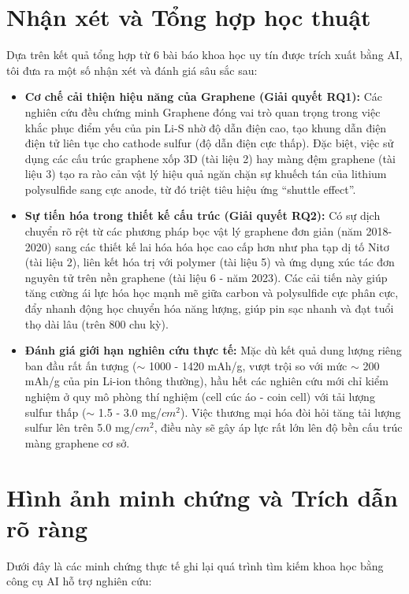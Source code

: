 \documentclass[12pt,a4paper]{article}
\begin{document}
\newpage
\section{Nhận xét và Tổng hợp học thuật}

Dựa trên kết quả tổng hợp từ 6 bài báo khoa học uy tín được trích xuất bằng AI, tôi đưa ra một số nhận xét và đánh giá sâu sắc sau:

\begin{itemize}
    \item \textbf{Cơ chế cải thiện hiệu năng của Graphene (Giải quyết RQ1):} Các nghiên cứu đều chứng minh Graphene đóng vai trò quan trọng trong việc khắc phục điểm yếu của pin Li-S nhờ độ dẫn điện cao, tạo khung dẫn điện điện tử liên tục cho cathode sulfur (độ dẫn điện cực thấp). Đặc biệt, việc sử dụng các cấu trúc graphene xốp 3D (tài liệu 2) hay màng đệm graphene (tài liệu 3) tạo ra rào cản vật lý hiệu quả ngăn chặn sự khuếch tán của lithium polysulfide sang cực anode, từ đó triệt tiêu hiệu ứng ``shuttle effect''.
    \item \textbf{Sự tiến hóa trong thiết kế cấu trúc (Giải quyết RQ2):} Có sự dịch chuyển rõ rệt từ các phương pháp bọc vật lý graphene đơn giản (năm 2018-2020) sang các thiết kế lai hóa hóa học cao cấp hơn như pha tạp dị tố Nitơ (tài liệu 2), liên kết hóa trị với polymer (tài liệu 5) và ứng dụng xúc tác đơn nguyên tử trên nền graphene (tài liệu 6 - năm 2023). Các cải tiến này giúp tăng cường ái lực hóa học mạnh mẽ giữa carbon và polysulfide cực phân cực, đẩy nhanh động học chuyển hóa năng lượng, giúp pin sạc nhanh và đạt tuổi thọ dài lâu (trên 800 chu kỳ).
    \item \textbf{Đánh giá giới hạn nghiên cứu thực tế:} Mặc dù kết quả dung lượng riêng ban đầu rất ấn tượng ($\sim$ 1000 - 1420 mAh/g, vượt trội so với mức $\sim$ 200 mAh/g của pin Li-ion thông thường), hầu hết các nghiên cứu mới chỉ kiểm nghiệm ở quy mô phòng thí nghiệm (cell cúc áo - coin cell) với tải lượng sulfur thấp ($\sim$ 1.5 - 3.0 mg/$cm^2$). Việc thương mại hóa đòi hỏi tăng tải lượng sulfur lên trên 5.0 mg/$cm^2$, điều này sẽ gây áp lực rất lớn lên độ bền cấu trúc màng graphene cơ sở.
\end{itemize}

\section{Hình ảnh minh chứng và Trích dẫn rõ ràng}

Dưới đây là các minh chứng thực tế ghi lại quá trình tìm kiếm khoa học bằng công cụ AI hỗ trợ nghiên cứu:
\end{document}
